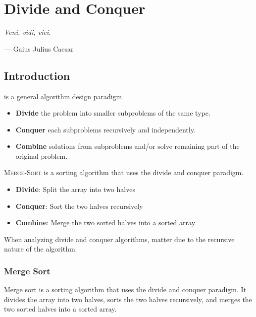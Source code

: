 \chapter{Divide and Conquer}

\textit{Veni, vidi, vici.} 
\begin{flushright}
    --- Gaius Julius Caesar
\end{flushright}

\section{Introduction}

 is a general algorithm design paradigm

\begin{itemize}
    \item \textbf{Divide} the problem into smaller subproblems of the same type.
    \item \textbf{Conquer} each subproblems recursively and independently.
    \item \textbf{Combine} solutions from subproblems and/or solve remaining part of the original problem.
\end{itemize}

\begin{example}
    \textsc{Merge-Sort} is a sorting algorithm that uses the divide and conquer paradigm.

    \begin{itemize}
        \item \textbf{Divide}: Split the array into two halves
        \item \textbf{Conquer}: Sort the two halves recursively
        \item \textbf{Combine}: Merge the two sorted halves into a sorted array
    \end{itemize}
\end{example}

\begin{remark}
    When analyzing divide and conquer algorithms,  matter due to the recursive nature of the algorithm.
\end{remark}

\subsection{Merge Sort}

Merge sort is a sorting algorithm that uses the divide and conquer paradigm. It divides the array into two halves, sorts the two halves recursively, and merges the two sorted halves into a sorted array.

